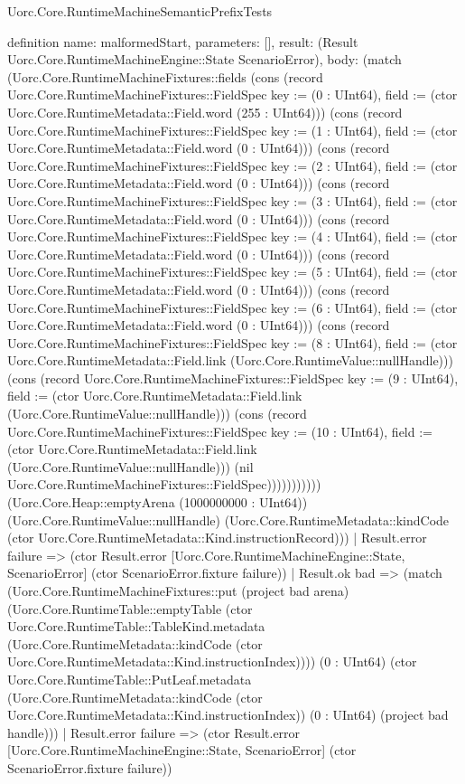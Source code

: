 \begin{lexlean}{Uorc.Core.RuntimeMachineSemanticPrefixTests}
\begin{semanticmodule}
definition{
  name: malformedStart,
  parameters: [],
  result: (Result Uorc.Core.RuntimeMachineEngine::State ScenarioError),
  body: (match (Uorc.Core.RuntimeMachineFixtures::fields (cons (record Uorc.Core.RuntimeMachineFixtures::FieldSpec {key := (0 : UInt64), field := (ctor Uorc.Core.RuntimeMetadata::Field.word (255 : UInt64))}) (cons (record Uorc.Core.RuntimeMachineFixtures::FieldSpec {key := (1 : UInt64), field := (ctor Uorc.Core.RuntimeMetadata::Field.word (0 : UInt64))}) (cons (record Uorc.Core.RuntimeMachineFixtures::FieldSpec {key := (2 : UInt64), field := (ctor Uorc.Core.RuntimeMetadata::Field.word (0 : UInt64))}) (cons (record Uorc.Core.RuntimeMachineFixtures::FieldSpec {key := (3 : UInt64), field := (ctor Uorc.Core.RuntimeMetadata::Field.word (0 : UInt64))}) (cons (record Uorc.Core.RuntimeMachineFixtures::FieldSpec {key := (4 : UInt64), field := (ctor Uorc.Core.RuntimeMetadata::Field.word (0 : UInt64))}) (cons (record Uorc.Core.RuntimeMachineFixtures::FieldSpec {key := (5 : UInt64), field := (ctor Uorc.Core.RuntimeMetadata::Field.word (0 : UInt64))}) (cons (record Uorc.Core.RuntimeMachineFixtures::FieldSpec {key := (6 : UInt64), field := (ctor Uorc.Core.RuntimeMetadata::Field.word (0 : UInt64))}) (cons (record Uorc.Core.RuntimeMachineFixtures::FieldSpec {key := (8 : UInt64), field := (ctor Uorc.Core.RuntimeMetadata::Field.link (Uorc.Core.RuntimeValue::nullHandle))}) (cons (record Uorc.Core.RuntimeMachineFixtures::FieldSpec {key := (9 : UInt64), field := (ctor Uorc.Core.RuntimeMetadata::Field.link (Uorc.Core.RuntimeValue::nullHandle))}) (cons (record Uorc.Core.RuntimeMachineFixtures::FieldSpec {key := (10 : UInt64), field := (ctor Uorc.Core.RuntimeMetadata::Field.link (Uorc.Core.RuntimeValue::nullHandle))}) (nil Uorc.Core.RuntimeMachineFixtures::FieldSpec))))))))))) (Uorc.Core.Heap::emptyArena (1000000000 : UInt64)) (Uorc.Core.RuntimeValue::nullHandle) (Uorc.Core.RuntimeMetadata::kindCode (ctor Uorc.Core.RuntimeMetadata::Kind.instructionRecord)))
    | Result.error failure => (ctor Result.error [Uorc.Core.RuntimeMachineEngine::State, ScenarioError] (ctor ScenarioError.fixture failure))
    | Result.ok bad => (match (Uorc.Core.RuntimeMachineFixtures::put (project bad arena) (Uorc.Core.RuntimeTable::emptyTable (ctor Uorc.Core.RuntimeTable::TableKind.metadata (Uorc.Core.RuntimeMetadata::kindCode (ctor Uorc.Core.RuntimeMetadata::Kind.instructionIndex)))) (0 : UInt64) (ctor Uorc.Core.RuntimeTable::PutLeaf.metadata (Uorc.Core.RuntimeMetadata::kindCode (ctor Uorc.Core.RuntimeMetadata::Kind.instructionIndex)) (0 : UInt64) (project bad handle)))
      | Result.error failure => (ctor Result.error [Uorc.Core.RuntimeMachineEngine::State, ScenarioError] (ctor ScenarioError.fixture failure))
}
\end{semanticmodule}
\end{lexlean}
